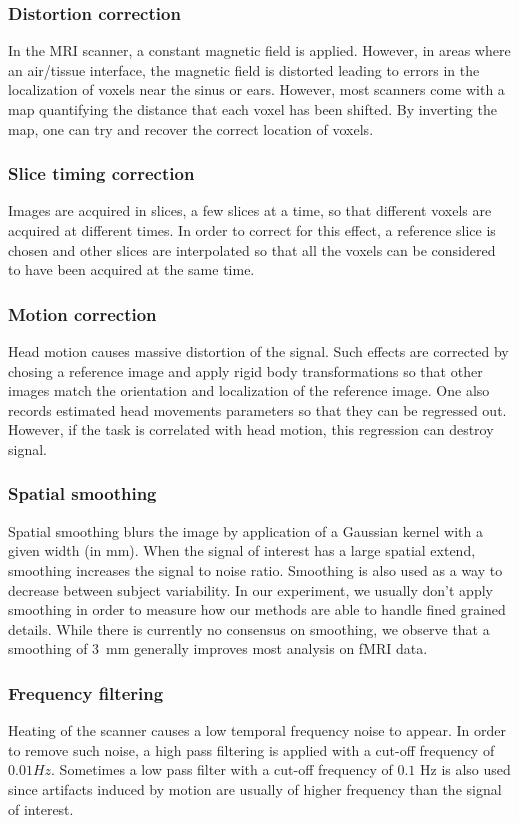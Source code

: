\subsubsection{Distortion correction}
In the MRI scanner, a constant magnetic field is applied. However, in areas
where an air/tissue interface, the magnetic field is distorted leading to errors in
the localization of voxels near the sinus or ears. However, most scanners come
with a map quantifying the distance that each voxel has been shifted. By
inverting the map, one can try and recover the correct location of voxels.


\subsubsection{Slice timing correction}
Images are acquired in slices, a few slices at a time, so that different voxels are acquired at different times.
In order to correct for this effect, a reference slice is chosen and other slices are interpolated so that all the voxels can be considered to have been acquired at the same time. 

\subsubsection{Motion correction}
Head motion causes massive distortion of the signal. Such effects are corrected by
chosing a reference image and apply rigid body transformations so that other
images match the orientation and localization of the reference image. One also records estimated head movements parameters so that they can be regressed out. However, if the task is correlated with head motion, this regression can destroy signal.

\subsubsection{Spatial smoothing}
Spatial smoothing blurs the image by application of a Gaussian kernel with a given width (in mm). When the signal of interest has a large spatial extend, smoothing increases the signal to noise ratio. 
Smoothing is also used as a way to decrease between subject variability.
In our experiment, we usually don't apply smoothing in order to measure how our
methods are able to handle fined grained details. While there is currently no
consensus on smoothing, we observe that a smoothing of 3~mm generally improves
most analysis on fMRI data.

\subsubsection{Frequency filtering}
Heating of the scanner causes a low temporal frequency noise to appear. In order
to remove such noise, a high pass filtering is applied with a cut-off frequency
of $0.01 Hz$. Sometimes a low pass filter with a cut-off frequency of $0.1$ Hz is also used since artifacts induced by motion are usually of higher frequency than the signal of interest.

